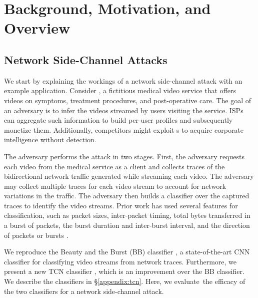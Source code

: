 \section{Background, Motivation, and Overview}
\label{sec:background}


\subsection{Network Side-Channel Attacks}
\label{subsec:attack-bg}

We start by explaining the workings of a network side-channel attack with an
example application.
Consider {\medvid}, a fictitious medical video service that offers videos on
symptoms, treatment procedures, and post-operative care.
The goal of an adversary is to infer the videos streamed by users visiting the
service.
ISPs can aggregate such information to build per-user profiles and subsequently
monetize them.
Additionally, competitors might exploit {\nsc}s to acquire corporate intelligence
without detection.

The adversary performs the attack in two stages. First, the adversary requests
each video from the medical service as a client and collects traces of the
bidirectional network traffic generated while streaming each video. The
adversary may collect multiple traces for each video stream to account for
network variations in the traffic. The adversary then builds a classifier over
the captured traces to identify the video streams.
Prior work has used several features for classification, such as packet sizes,
inter-packet timing, total bytes transferred in a burst of packets, the burst
duration and inter-burst interval, and the direction of packets or bursts
\cite{schuster2017beautyburst}.

We reproduce the Beauty and the Burst (BB) classifier
\cite{schuster2017beautyburst}, a state-of-the-art CNN
classifier for classifying video streams from network traces.
Furthermore, we present a new TCN classifier \cite{bai2018tcn}, which is an
improvement over the BB classifier.
We describe the classifiers in \S\ref{appendix:tcn}.
Here, we evaluate~the efficacy of the two classifiers for a network side-channel
attack.

